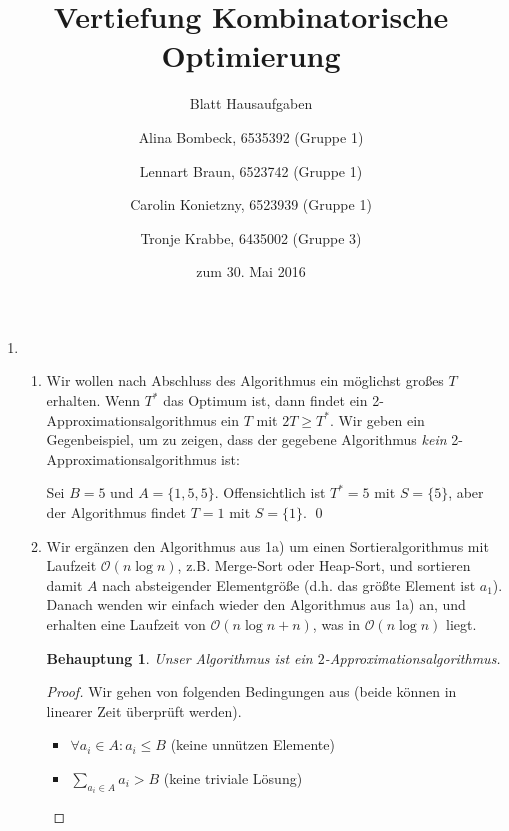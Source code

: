 \documentclass[a4paper]{scrartcl}
\title{Vertiefung Kombinatorische Optimierung}
\subtitle{Blatt {\blattnr} Hausaufgaben}
\author{%
    Alina Bombeck, 6535392 (Gruppe 1) \and
    Lennart Braun, 6523742 (Gruppe 1) \and
    Carolin Konietzny, 6523939 (Gruppe 1) \and
    Tronje Krabbe, 6435002 (Gruppe 3)
}
\date{zum 30. Mai 2016}
\newcommand{\approxalg}[1]{$#1$-Ap\-pro\-xi\-ma\-ti\-ons\-al\-go\-rith\-mus}
\newtheorem*{proposition}{Behauptung}
\newcommand{\Oh}{\mathcal{O}}
\begin{document}
\maketitle


\begin{enumerate}[label=\bfseries \arabic*.]
\item %
\begin{enumerate}
    \item %
        Wir wollen nach Abschluss des Algorithmus ein möglichst großes $T$ erhalten.
        Wenn $T^*$ das Optimum ist, dann findet ein 2-Approximationsalgorithmus
        ein $T$ mit $2T \geq T^*$.
        Wir geben ein Gegenbeispiel, um zu zeigen, dass der gegebene Algorithmus
        \textit{kein} 2-Approximationsalgorithmus ist:

        Sei $B = 5$ und $A = \{1, 5, 5\}$. Offensichtlich ist $T^* = 5$
        mit $S= \{5\}$, aber der Algorithmus findet $T = 1$ mit $S = \{1\}$.
        \qed
    \item %
        Wir ergänzen den Algorithmus aus 1a) um einen Sortieralgorithmus
        mit Laufzeit $\Oh(n \log n)$, z.B. Merge-Sort oder Heap-Sort, und
        sortieren damit $A$ nach absteigender Elementgröße (d.h. das größte
        Element ist $a_1$).
        Danach wenden wir einfach wieder den Algorithmus aus 1a) an, und erhalten
        eine Laufzeit von $\Oh(n \log n + n)$, was in $\Oh(n \log n)$ liegt.
        \\
        \begin{proposition}
            Unser Algorithmus ist ein \approxalg{2}.
        \end{proposition}
        \begin{proof}
            Wir gehen von folgenden Bedingungen aus (beide können in linearer
            Zeit überprüft werden).
            \begin{itemize}
                \item $\forall a_i \in A : a_i \leq B$ (keine unnützen Elemente)
                \item $\sum_{a_i \in A} a_i > B$ (keine triviale Lösung)
            \end{itemize}


\end{proof}
\end{enumerate}
\end{enumerate}
\end{document}
